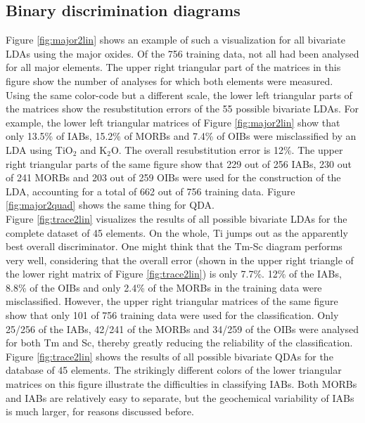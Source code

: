 \documentclass{article}
\begin{document}
\subsection{Binary discrimination diagrams}
\label{sec:binary}

Figure \ref{fig:major2lin}  shows an  example of such  a visualization
for all  bivariate LDAs  using the major  oxides. Of the  756 training
data, not  all had  been analysed for  all major elements.   The upper
right triangular part  of the matrices in this  figure show the number
of analyses  for which  both elements were  measured.  Using  the same
color-code but a  different scale, the lower left  triangular parts of
the  matrices  show  the  resubstitution  errors of  the  55  possible
bivariate LDAs.   For example, the  lower left triangular  matrices of
Figure \ref{fig:major2lin}  show that only  13.5\% of IABs,  15.2\% of
MORBs and 7.4\% of OIBs were misclassified by an LDA using TiO$_2$ and
K$_2$O.  The  overall resubstitution error  is 12\%.  The  upper right
triangular parts of the same figure show that 229 out of 256 IABs, 230
out  of  241  MORBs  and  203  out  of 259  OIBs  were  used  for  the
construction of  the LDA,  accounting for  a total of  662 out  of 756
training data.   Figure \ref{fig:major2quad} shows the  same thing for
QDA.\\

Figure  \ref{fig:trace2lin}  visualizes the  results  of all  possible
bivariate LDAs for the complete  dataset of 45 elements. On the whole,
Ti jumps out as the  apparently best overall discriminator.  One might
think that the Tm-Sc diagram  performs very well, considering that the
overall error  (shown in the upper  right triangle of  the lower right
matrix of Figure \ref{fig:trace2lin}) is only 7.7\%. 12\% of the IABs,
8.8\% of  the OIBs and  only 2.4\% of  the MORBs in the  training data
were misclassified.  However, the  upper right triangular  matrices of
the same figure show that only  101 of 756 training data were used for
the classification.  Only 25/256 of  the IABs, 42/241 of the MORBs and
34/259 of the  OIBs were analysed for both Tm  and Sc, thereby greatly
reducing    the   reliability    of   the    classification.    Figure
\ref{fig:trace2lin} shows  the results of all  possible bivariate QDAs
for the  database of 45  elements. The strikingly different  colors of
the  lower   triangular  matrices   on  this  figure   illustrate  the
difficulties in  classifying IABs. Both MORBs and  IABs are relatively
easy  to separate,  but the  geochemical variability  of IABs  is much
larger, for reasons discussed before.\\
\end{document}
